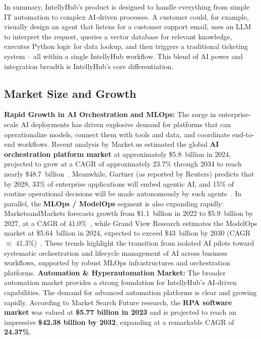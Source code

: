 \documentclass[11pt, a4paper, oneside]{article}
\begin{document}
In summary, IntellyHub's product is designed to handle everything from simple IT automation to complex AI-driven processes. A customer could, for example, visually design an agent that listens for a customer support email, uses an LLM to interpret the request, queries a vector database for relevant knowledge, executes Python logic for data lookup, and then triggers a traditional ticketing system – all within a single IntellyHub workflow. This blend of AI power and integration breadth is IntellyHub's core differentiation.

\subsection{Market Size and Growth}
\textbf{Rapid Growth in AI Orchestration and MLOps:} The surge in enterprise-scale AI deployments has driven explosive demand for platforms that can operationalize models, connect them with tools and data, and coordinate end-to-end workflows.  
Recent analysis by Market.us estimated the global \textbf{AI orchestration platform market} at approximately \$5.8~billion in 2024, projected to grow at a CAGR of approximately 23.7\% through 2034 to reach nearly \$48.7~billion~\cite{AIOrch}.  
Meanwhile, Gartner (as reported by Reuters) predicts that by 2028, 33\% of enterprise applications will embed agentic AI, and 15\% of routine operational decisions will be made autonomously by such agents~\cite{GartnerAgentic}.  
In parallel, the \textbf{MLOps / ModelOps} segment is also expanding rapidly: MarketsandMarkets forecasts growth from \$1.1~billion in 2022 to \$5.9~billion by 2027, at a CAGR of 41.0\%~\cite{MLOpsMM}, while Grand View Research estimates the ModelOps market at \$5.64~billion in 2024, expected to exceed \$43~billion by 2030 (CAGR $\approx$ 41.3\%)~\cite{ModelOpsGV}.  
These trends highlight the transition from isolated AI pilots toward systematic orchestration and lifecycle management of AI across business workflows, supported by robust MLOps infrastructures and orchestration platforms.\newline\newline
\textbf{Automation \& Hyperautomation Market:} The broader automation market provides a strong foundation for IntellyHub's AI-driven capabilities. The demand for advanced automation platforms is clear and growing rapidly. According to Market Search Future research, the \textbf{RPA software market} was valued at \textbf{\$5.77 billion in 2023} and is projected to reach an impressive \textbf{\$42.38 billion by 2032}, expanding at a remarkable CAGR of \textbf{24.37\%}\cite{mrfRPA}.
\end{document}
